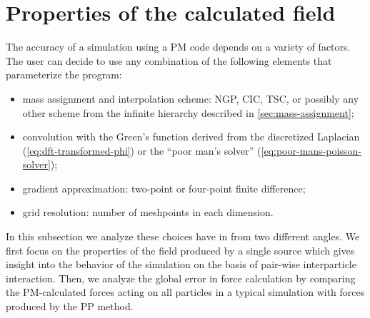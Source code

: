 \section{Properties of the calculated field}
The accuracy of a simulation using a PM code depends on a variety of factors.
The user can decide to use any combination of the following elements that parameterize the program:
\begin{itemize}
    \item mass assignment and interpolation scheme: NGP, CIC, TSC, or possibly any other scheme from the infinite hierarchy described in \autoref{sec:mass-assignment};
    \item convolution with the Green's function derived from the discretized Laplacian (\autoref{eq:dft-transformed-phi}) or the ``poor man's solver'' (\autoref{eq:poor-mans-poisson-solver});
    \item gradient approximation: two-point or four-point finite difference;
    \item grid resolution: number of meshpoints in each dimension.
\end{itemize}
In this subsection we analyze these choices have in from two different angles.
We first focus on the properties of the field produced by a single source which gives insight into the behavior of the simulation on the basis of pair-wise interparticle interaction.
Then, we analyze the global error in force calculation by comparing the PM-calculated forces acting on all particles in a typical simulation with forces produced by the PP method.

